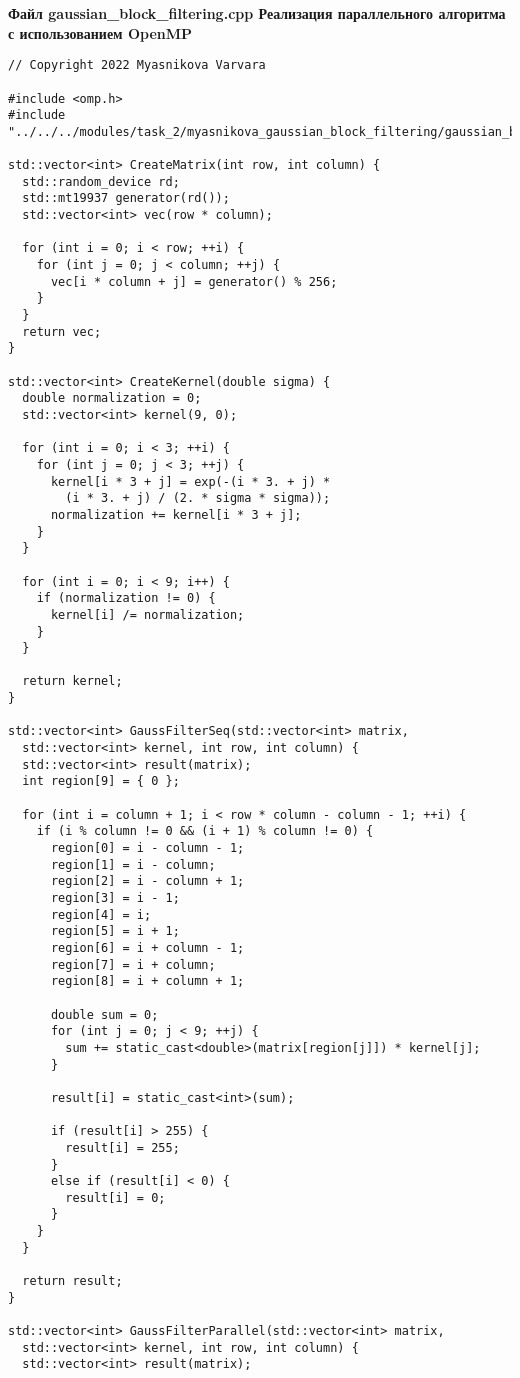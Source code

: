 \documentclass{report}
\begin{document}
\textbf{ Файл gaussian\_block\_filtering.cpp Реализация параллельного алгоритма с использованием OpenMP}
\begin{lstlisting}
// Copyright 2022 Myasnikova Varvara

#include <omp.h>
#include "../../../modules/task_2/myasnikova_gaussian_block_filtering/gaussian_block_filtering.h"

std::vector<int> CreateMatrix(int row, int column) {
  std::random_device rd;
  std::mt19937 generator(rd());
  std::vector<int> vec(row * column);

  for (int i = 0; i < row; ++i) {
    for (int j = 0; j < column; ++j) {
      vec[i * column + j] = generator() % 256;
    }
  }
  return vec;
}

std::vector<int> CreateKernel(double sigma) {
  double normalization = 0;
  std::vector<int> kernel(9, 0);

  for (int i = 0; i < 3; ++i) {
    for (int j = 0; j < 3; ++j) {
      kernel[i * 3 + j] = exp(-(i * 3. + j) *
        (i * 3. + j) / (2. * sigma * sigma));
      normalization += kernel[i * 3 + j];
    }
  }

  for (int i = 0; i < 9; i++) {
    if (normalization != 0) {
      kernel[i] /= normalization;
    }
  }

  return kernel;
}

std::vector<int> GaussFilterSeq(std::vector<int> matrix,
  std::vector<int> kernel, int row, int column) {
  std::vector<int> result(matrix);
  int region[9] = { 0 };

  for (int i = column + 1; i < row * column - column - 1; ++i) {
    if (i % column != 0 && (i + 1) % column != 0) {
      region[0] = i - column - 1;
      region[1] = i - column;
      region[2] = i - column + 1;
      region[3] = i - 1;
      region[4] = i;
      region[5] = i + 1;
      region[6] = i + column - 1;
      region[7] = i + column;
      region[8] = i + column + 1;

      double sum = 0;
      for (int j = 0; j < 9; ++j) {
        sum += static_cast<double>(matrix[region[j]]) * kernel[j];
      }

      result[i] = static_cast<int>(sum);

      if (result[i] > 255) {
        result[i] = 255;
      }
      else if (result[i] < 0) {
        result[i] = 0;
      }
    }
  }

  return result;
}

std::vector<int> GaussFilterParallel(std::vector<int> matrix,
  std::vector<int> kernel, int row, int column) {
  std::vector<int> result(matrix);


\end{lstlisting}
\end{document}
